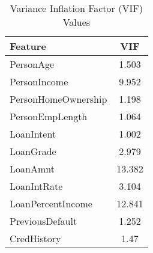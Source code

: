 \begin{table}[H]\centering
\caption{Variance Inflation Factor (VIF) Values}
\label{Table 4:vif_values}
\begin{tabular}{lc}
\toprule
Feature & VIF \\
\midrule
PersonAge & 1.503 \\
PersonIncome & 9.952 \\
PersonHomeOwnership & 1.198 \\
PersonEmpLength & 1.064 \\
LoanIntent & 1.002 \\
LoanGrade & 2.979 \\
LoanAmnt & 13.382 \\
LoanIntRate & 3.104 \\
LoanPercentIncome & 12.841 \\
PreviousDefault & 1.252 \\
CredHistory & 1.47 \\
\bottomrule
\end{tabular}
\end{table}
